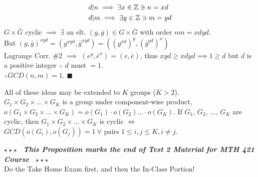 \begin{proposition}
\begin{align}
&d | n \implies \exists x\in {\mathbb{ Z}} \ni n=xd \nonumber \\
&d | m \implies \exists y\in {\mathbb{ Z}} \ni m=yd \nonumber
\end{align}
$G\times \bar{G}$ cyclic $\implies \ \exists $ an elt. $(g,\bar{g})\in G\times \bar{G}$ with order $nm=xdyd$. \steezybreak\\
But $(g,\bar{g})^{xyd} = (g^{xyd},\bar{g}^{xyd})=((g^{xd})^y, (\bar{g}^{yd})^x)$ \steezybreak\\
Lagrange Corr. \#2 $\implies$ $(e^y,\bar{e}^x)=(e,\bar{e})$, thus $xyd \geq xdyd \implies 1\geq d$ but $d$ is a positive integer $\therefore$ $d$ must $=1$.\steezybreak\\
$\therefore GCD(n,m)=1$. $\blacksquare$
\end{proposition}

All of these ideas may be extended to $K$ groups ($K>2$). \steezybreak\\
$G_1\times G_2 \times \dots \times G_K$ is a group under component-wise product, $o(G_1\times G_2\times \dots \times G_K)=o(G_1)\cdot o(G_2) \dots \cdot o(G_K)$. If $G_1$, $G_2$, ..., $G_K$ are cyclic, then $G_1\times G_2\times \dots \times G_K$ is cyclic $\iff$ $GCD(o(G_i),o(G_j))=1 \ \forall \text{ pairs } 1\leq i,j\leq K, i\neq j$.

\steezybreak
\begin{tcolorbox}
\begin{center}
    $\star\star\star$ \textbf{\textit{~This Proposition marks the end of Test 2 Material for MTH 421 Course~}} $\star\star\star$ \\
    Do the Take Home Exam first, and then the In-Class Portion!
\end{center}
\end{tcolorbox}

